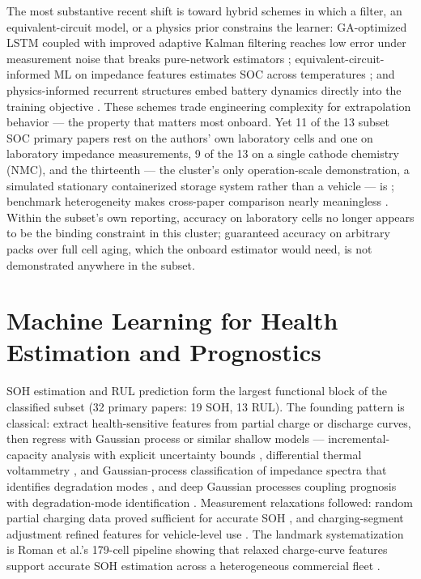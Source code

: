 \documentclass[journal]{IEEEtran}
\begin{document}
The most substantive recent shift is toward hybrid schemes in which a filter, an equivalent-circuit model, or a physics prior constrains the learner: GA-optimized LSTM coupled with improved adaptive Kalman filtering reaches low error under measurement noise that breaks pure-network estimators \cite{r41}; equivalent-circuit-informed ML on impedance features estimates SOC across temperatures \cite{r42}; and physics-informed recurrent structures embed battery dynamics directly into the training objective \cite{r10}. These schemes trade engineering complexity for extrapolation behavior --- the property that matters most onboard. Yet 11 of the 13 subset SOC primary papers rest on the authors' own laboratory cells and one on laboratory impedance measurements, 9 of the 13 on a single cathode chemistry (NMC), and the thirteenth --- the cluster's only operation-scale demonstration, a simulated stationary containerized storage system rather than a vehicle --- is \cite{r38}; benchmark heterogeneity makes cross-paper comparison nearly meaningless \cite{r1}\cite{r18}. Within the subset's own reporting, accuracy on laboratory cells no longer appears to be the binding constraint in this cluster; guaranteed accuracy on arbitrary packs over full cell aging, which the onboard estimator would need, is not demonstrated anywhere in the subset.

\section{Machine Learning for Health Estimation and Prognostics}

SOH estimation and RUL prediction form the largest functional block of the classified subset (32 primary papers: 19 SOH, 13 RUL). The founding pattern is classical: extract health-sensitive features from partial charge or discharge curves, then regress with Gaussian process or similar shallow models --- incremental-capacity analysis with explicit uncertainty bounds \cite{r43}, differential thermal voltammetry \cite{r44}, and Gaussian-process classification of impedance spectra that identifies degradation modes \cite{r45}, and deep Gaussian processes coupling prognosis with degradation-mode identification \cite{r46}. Measurement relaxations followed: random partial charging data proved sufficient for accurate SOH \cite{r47}, and charging-segment adjustment refined features for vehicle-level use \cite{r48}. The landmark systematization is Roman et al.'s 179-cell pipeline showing that relaxed charge-curve features support accurate SOH estimation across a heterogeneous commercial fleet \cite{r49}.
\end{document}
